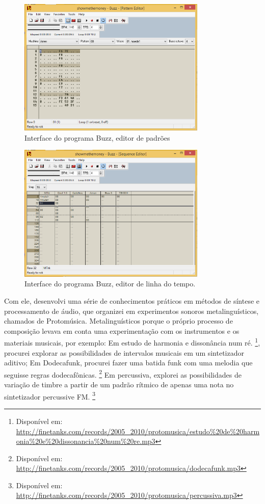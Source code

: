 \begin{figure}

\includegraphics[width=0.8\textwidth]{pictures/cap1/buzz}
\caption{Interface do programa Buzz, editor de padrões}
\label{fig:buzz}
\end{figure}

\begin{figure}

\includegraphics[width=0.8\textwidth]{pictures/cap1/buzz3}
\caption{Interface do programa Buzz, editor de linha do tempo.}
\label{fig:buzz3}
\end{figure}

Com ele, desenvolvi uma série de conhecimentos práticos em métodos de síntese e processamento de áudio, que organizei em experimentos sonoros metalinguísticos, chamados de Protomúsica. Metalinguísticos porque o próprio processo de composição levava em conta uma experimentação com os instrumentos e os materiais musicais, por exemplo:
Em estudo de harmonia e dissonância num ré. \footnote{Disponível em: \url{http://finetanks.com/records/2005_2010/protomusica/estudo\%20de\%20harmonia\%20e\%20dissonancia\%20num\%20re.mp3}}, procurei explorar as possibilidades de intervalos musicais em um sintetizador aditivo;
Em Dodecafunk, procurei fazer uma batida funk com uma melodia que seguisse regras dodecafônicas. \footnote{Disponível em: \url{http://finetanks.com/records/2005_2010/protomusica/dodecafunk.mp3}}
Em percussiva, explorei as possibilidades de variação de timbre a partir de um padrão rítmico de apenas uma nota no sintetizador percussive FM. \footnote{Disponível em: \url{http://finetanks.com/records/2005_2010/protomusica/percussiva.mp3}}

